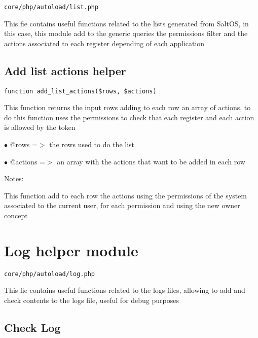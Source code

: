 \documentclass[a4paper]{book}
\begin{document}
\begin{lstlisting}
core/php/autoload/list.php
\end{lstlisting}

This fie contains useful functions related to the lists generated from SaltOS, in this case, this
module add to the generic queries the permissions filter and the actions associated to each register
depending of each application

\hypertarget{toc183}{}
\subsection{Add list actions helper}

\begin{lstlisting}
function add_list_actions($rows, $actions)
\end{lstlisting}

This function returns the input rows adding to each row an array of actions,
to do this function uses the permissions to check that each register and each
action is allowed by the token

\begin{compactitem}
\item[\color{myblue}$\bullet$] @rows    =$>$ the rows used to do the list
\item[\color{myblue}$\bullet$] @actions =$>$ an array with the actions that want to be added in each row
\end{compactitem}

Notes:

This function add to each row the actions using the permissions of the system
associated to the current user, for each permission and using the new owner
concept

\hypertarget{toc184}{}
\section{Log helper module}

\begin{lstlisting}
core/php/autoload/log.php
\end{lstlisting}

This fie contains useful functions related to the logs files, allowing to add and check contents
to the logs file, useful for debug purposes

\hypertarget{toc185}{}
\subsection{Check Log}
\end{document}
